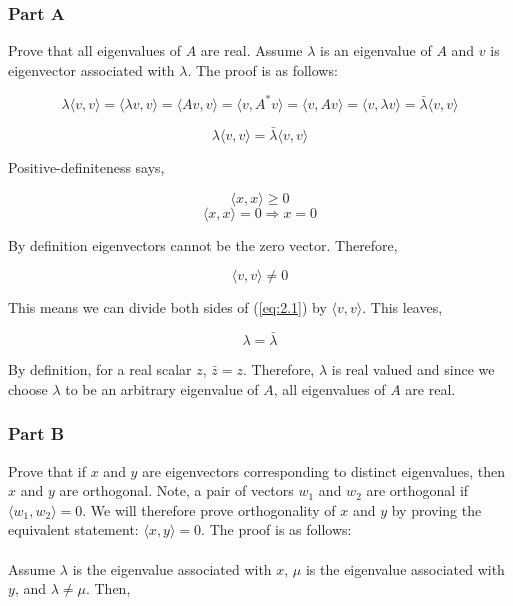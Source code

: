 \subsubsection{Part A}

Prove that all eigenvalues of \(A\) are real. Assume \( \lambda \) is an eigenvalue of \(A\) and \(v\) is eigenvector associated with \( \lambda \). The proof is as follows:

\begin{equation}
  \lambda \langle v,v \rangle 
  = \langle \lambda v,v \rangle 
  = \langle Av,v \rangle
  = \langle v,A^{*}v \rangle
  = \langle v,Av \rangle
  = \langle v,\lambda v \rangle
  = \bar{\lambda} \langle v,v \rangle
\end{equation}

\begin{equation}
  \lambda \langle v,v \rangle
  = \bar{\lambda} \langle v,v \rangle
\label{eq:2.1}
\end{equation}

Positive-definiteness says,

\begin{equation}
  \langle x,x \rangle \geq 0
\end{equation}
\begin{equation}
  \langle x,x \rangle = 0 \Rightarrow x = 0
\end{equation}

By definition eigenvectors cannot be the zero vector. Therefore,

\begin{equation}
  \langle v,v \rangle \ne 0
\end{equation}

This means we can divide both sides of (\ref{eq:2.1}) by \( \langle v,v \rangle \). This leaves,

\begin{equation}
  \lambda = \bar{\lambda}
\end{equation}

By definition, for a real scalar \(z\), \(\bar{z} = z\). Therefore, \( \lambda \) is real valued and since we choose \(\lambda\) to be an arbitrary eigenvalue of \(A\), all eigenvalues of \(A\) are real.

\newpage
\subsubsection{Part B}

Prove that if \(x\) and \(y\) are eigenvectors corresponding to distinct eigenvalues, then \(x\) and \(y\) are orthogonal. Note, a pair of vectors \(w_1\) and \(w_2\) are orthogonal if \( \langle w_1,w_2 \rangle = 0\). We will therefore prove orthogonality of \(x\) and \(y\) by proving the equivalent statement: \( \langle x,y \rangle = 0 \). The proof is as follows:
\\
\\
\indent Assume \(\lambda\) is the eigenvalue associated with \(x\), \(\mu\) is the eigenvalue associated with \(y\), and \(\lambda \ne \mu\). Then,

